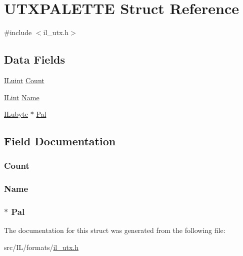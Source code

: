 \hypertarget{struct_u_t_x_p_a_l_e_t_t_e}{\section{U\-T\-X\-P\-A\-L\-E\-T\-T\-E Struct Reference}
\label{struct_u_t_x_p_a_l_e_t_t_e}
}


{\ttfamily \#include $<$il\-\_\-utx.\-h$>$}

\subsection*{Data Fields}
\begin{DoxyCompactItemize}
\item 
\hyperlink{il_8h_ac6508d0e9c19e32f32e00d54b5b8cf30}{I\-Luint} \hyperlink{struct_u_t_x_p_a_l_e_t_t_e_ae47966249258ef1f08430444cdca8892}{Count}
\item 
\hyperlink{il_8h_a288a97fb9e92e707a60b749d0039fafe}{I\-Lint} \hyperlink{struct_u_t_x_p_a_l_e_t_t_e_adabc5e254a5e3a54d273adeda42cd6ff}{Name}
\item 
\hyperlink{il_8h_a8d2f04500100a86d1b00e98ab1b15a33}{I\-Lubyte} $\ast$ \hyperlink{struct_u_t_x_p_a_l_e_t_t_e_a561a236b698c68d57abbac93ddd37815}{Pal}
\end{DoxyCompactItemize}


\subsection{Field Documentation}
\hypertarget{struct_u_t_x_p_a_l_e_t_t_e_ae47966249258ef1f08430444cdca8892}{
\subsubsection[{Count}]{ Count}}\label{struct_u_t_x_p_a_l_e_t_t_e_ae47966249258ef1f08430444cdca8892}
\hypertarget{struct_u_t_x_p_a_l_e_t_t_e_adabc5e254a5e3a54d273adeda42cd6ff}{
\subsubsection[{Name}]{ Name}}\label{struct_u_t_x_p_a_l_e_t_t_e_adabc5e254a5e3a54d273adeda42cd6ff}
\hypertarget{struct_u_t_x_p_a_l_e_t_t_e_a561a236b698c68d57abbac93ddd37815}{
\subsubsection[{Pal}]{$\ast$ Pal}}\label{struct_u_t_x_p_a_l_e_t_t_e_a561a236b698c68d57abbac93ddd37815}


The documentation for this struct was generated from the following file\-:\begin{DoxyCompactItemize}
\item 
src/\-I\-L/formats/\hyperlink{il__utx_8h}{il\-\_\-utx.\-h}\end{DoxyCompactItemize}
